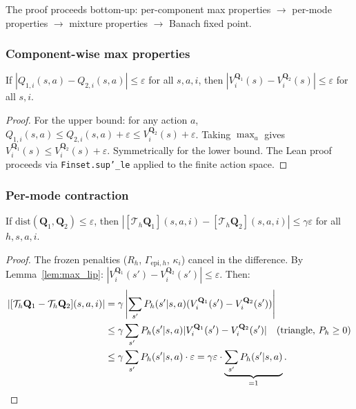 The proof proceeds bottom-up: per-component max properties $\to$ per-mode properties $\to$ mixture properties $\to$ Banach fixed point.

\subsubsection{Component-wise max properties}

\begin{lemma}
\label{lem:max_lip}
If $|Q_{1,i}(s,a) - Q_{2,i}(s,a)| \le \varepsilon$ for all $s,a,i$, then $|V_i^{\mathbf{Q}_1}(s) - V_i^{\mathbf{Q}_2}(s)| \le \varepsilon$ for all $s,i$.
\end{lemma}

\begin{proof}
For the upper bound: for any action $a$, $Q_{1,i}(s,a) \le Q_{2,i}(s,a) + \varepsilon \le V_i^{\mathbf{Q}_2}(s) + \varepsilon$.  Taking $\max_a$ gives $V_i^{\mathbf{Q}_1}(s) \le V_i^{\mathbf{Q}_2}(s) + \varepsilon$.  Symmetrically for the lower bound.  The Lean proof proceeds via \texttt{Finset.sup'\_le} applied to the finite action space.
\end{proof}

\subsubsection{Per-mode contraction}

\begin{lemma}
\label{lem:mode_bound}
If $\mathrm{dist}(\mathbf{Q}_1, \mathbf{Q}_2) \le \varepsilon$, then $|[\mathcal{T}_h \mathbf{Q}_1](s,a,i) - [\mathcal{T}_h \mathbf{Q}_2](s,a,i)| \le \gamma\varepsilon$ for all $h,s,a,i$.
\end{lemma}

\begin{proof}
The frozen penalties ($R_h$, $\Gamma_{\mathrm{epi},h}$, $\kappa_i$) cancel in the difference.  By Lemma~\ref{lem:max_lip}: $|V_i^{\mathbf{Q}_1}(s') - V_i^{\mathbf{Q}_2}(s')| \le \varepsilon$.  Then:
\begin{align}
    |[\mathcal{T}_h \mathbf{Q}_1 - \mathcal{T}_h \mathbf{Q}_2](s,a,i)| &= \gamma \left|\sum_{s'} P_h(s'|s,a)(V_i^{\mathbf{Q}_1}(s') - V_i^{\mathbf{Q}_2}(s'))\right| \notag \\
    &\le \gamma \sum_{s'} P_h(s'|s,a) |V_i^{\mathbf{Q}_1}(s') - V_i^{\mathbf{Q}_2}(s')| \quad \text{(triangle, $P_h \ge 0$)} \notag \\
    &\le \gamma \sum_{s'} P_h(s'|s,a) \cdot \varepsilon = \gamma\varepsilon \cdot \underbrace{\sum_{s'} P_h(s'|s,a)}_{=1}. \qedhere
\end{align}
\end{proof}

